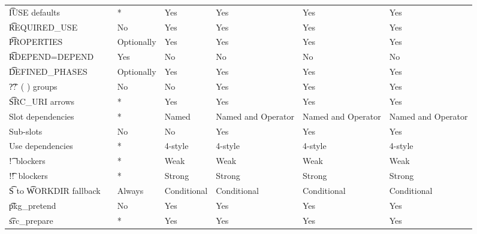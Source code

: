\begin{landscape}
\begin{longtable}{llP{7.5em}P{7.5em}P{7.5em}P{7.5em}P{7.5em}}
\t{IUSE} defaults &  &
    * & Yes & Yes & Yes & Yes \\

\t{REQUIRED_USE} &  &
    No & Yes & Yes & Yes & Yes \\

\t{PROPERTIES} &  &
    Optionally & Yes & Yes & Yes & Yes \\

\t{RDEPEND=DEPEND} &  &
    Yes & No & No & No & No \\

\t{DEFINED_PHASES} &  &
    Optionally & Yes & Yes & Yes & Yes \\

\t{??\ ( )} groups &  &
    No & No & Yes & Yes & Yes \\

\t{SRC_URI} arrows &  &
    * & Yes & Yes & Yes & Yes \\

Slot dependencies &  &
    * & Named & Named and Operator & Named and Operator & Named and Operator \\

Sub-slots &  &
    No & No & Yes & Yes & Yes \\

Use dependencies &  &
    * & 4-style & 4-style & 4-style & 4-style \\

\t{!}\ blockers &  &
    * & Weak & Weak & Weak & Weak \\

\t{!!}\ blockers &  &
    * & Strong & Strong & Strong & Strong \\

\t{S} to \t{WORKDIR} fallback &  &
    Always & Conditional & Conditional & Conditional & Conditional \\

\t{pkg_pretend} &  &
    No & Yes & Yes & Yes & Yes \\

\t{src_prepare} &  &
    * & Yes & Yes & Yes & Yes \\


\end{longtable}
\end{landscape}
